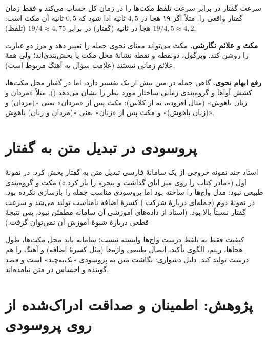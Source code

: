 \begin{addedbox}{سرعت گفتار در برابر سرعت تلفظ}
 مکث‌ها را در زمان کل حساب می‌کند و  فقط زمان گفتار واقعی را. مثلاً اگر ۱۹ هجا در $4{,}5$ ثانیه ادا شود که $0{,}5$ ثانیه آن مکث است: $19/4{,}5\approx 4{,}2$ هجا در ثانیه (گفتار) در برابر $19/4\approx 4{,}75$ (تلفظ).
\end{addedbox}

\textbf{مکث و علائم نگارشی.} مکث می‌تواند معنای نحوی جمله را تغییر دهد و مرز دو عبارت را روشن کند. ویرگول، دونقطه و نقطه نشانهٔ محل مکث یا بخش‌بندی‌اند؛ ولی همهٔ علائم زمانی نیستند (علامت سؤال به آهنگ مربوط است).

\textbf{رفع ابهام نحوی.} گاهی جمله در متن بیش از یک تفسیر دارد، اما در گفتار محل مکث‌ها، کشش آواها و گروه‌بندی زمانی ساختار مورد نظر را نشان می‌دهد (). مثلاً «مردان و زنان باهوش» (مثال افزوده، نه از کلاس): مکث پس از «مردان» یعنی «(مردان) و (زنان باهوش)» و مکث پس از «زنان» یعنی «(مردان و زنان) باهوش».


\section{پروسودی در تبدیل متن به گفتار}

استاد چند نمونه خروجی از یک سامانهٔ فارسی تبدیل متن به گفتار پخش کرد. در نمونهٔ اول («مادر کتاب را روی میز اتاق گذاشت و پنجره را باز کرد.») مکث و گروه‌بندی طبیعی نبود: مدل واج‌ها را ساخته بود اما پروسودی مناسب جمله را بازسازی نکرده بود. در نمونهٔ دوم (جمله‌ای دربارهٔ شرکت ) کسرهٔ اضافه نامناسب تولید می‌شد و سرعت گفتار نسبتاً بالا بود. (استاد از داده‌های آموزشی آن سامانه مطمئن نبود، پس نتیجهٔ قطعی دربارهٔ شیوهٔ آموزش آن نمی‌توان گرفت.)

کیفیت  فقط به تلفظ درست واج‌ها وابسته نیست؛ سامانه باید محل مکث‌ها، طول هجاها، ریتم، الگوی تأکید، اتصال طبیعی واژه‌ها (مثل کسرهٔ اضافه) و آهنگ را هم درست تولید کند. دلیل دشواری: نگاشت متن به پروسودی «یک‌به‌چند» است و قصد گوینده و احساس در متن نیامده‌اند.

\section{پژوهش: اطمینان و صداقت ادراک‌شده از روی پروسودی}

